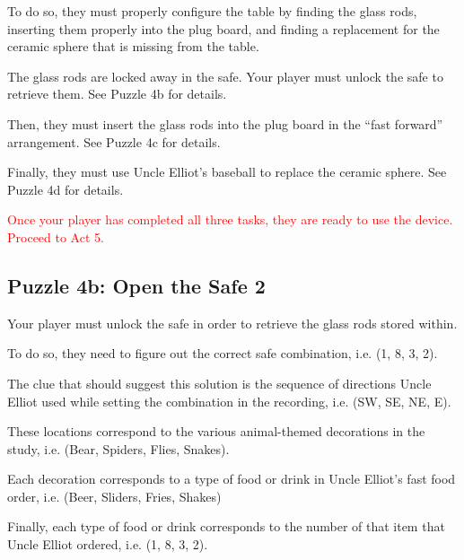 \documentclass[a6paper, parskip=half, DIV=14, 12pt]{scrartcl}
\begin{document}
To do so, they must properly configure the table by finding the glass rods, inserting them properly into the plug board, and finding a replacement for the ceramic sphere that is missing from the table. 

The glass rods are locked away in the safe. Your player must unlock the safe to retrieve them. See Puzzle 4b for details.

Then, they must insert the glass rods into the plug board in the ``fast forward'' arrangement. See Puzzle 4c for details.

Finally, they must use Uncle Elliot's baseball to replace the ceramic sphere. See Puzzle 4d for details.

\textcolor{Red}{Once your player has completed all three tasks, they are ready to use the device. Proceed to Act 5.} 
\newpage

\subsection*{Puzzle 4b: Open the Safe 2}
Your player must unlock the safe in order to retrieve the glass rods stored within.

To do so, they need to figure out the correct safe combination, i.e. (1, 8, 3, 2).

The clue that should suggest this solution is the sequence of directions Uncle Elliot used while setting the combination in the recording, i.e. (SW, SE, NE, E).

These locations correspond to the various animal-themed decorations in the study, i.e. (Bear, Spiders, Flies, Snakes).

Each decoration corresponds to a type of food or drink in Uncle Elliot's fast food order, i.e. (Beer, Sliders, Fries, Shakes)

Finally, each type of food or drink corresponds to the number of that item that Uncle Elliot ordered, i.e. (1, 8, 3, 2).
\end{document}
